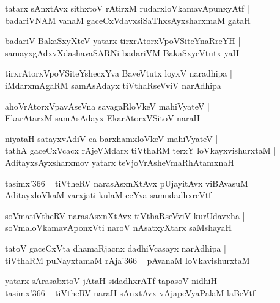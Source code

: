 \documentclass[twoside,12pt,openright]{book}
\newcounter{shloka}[chapter]
\begin{document}
\begin{shloka}
tatarx sAnxtAvx sithxtoV rAtirxM rudarxloVkamavApunxyAtf |\\
badariVNAM vanaM gaceCxVdavxsiSaThxsAyxsharxmaM gataH 
\end{shloka}

\begin{shloka}
badariV BakaSxyXteV yatarx tirxrAtorxVpoVSiteYnaRreYH |\\
samayxgAdxvXdashavaSARNi badariVM BakaSxyeVtutx yaH 
\end{shloka}

\begin{shloka}
tirxrAtorxVpoVSiteYshecxYva BaveVtutx loyxV naradhipa |\\
iMdarxmAgaRM samAsAdayx tiVthaRseVviV narAdhipa
\end{shloka}

\begin{shloka}
ahoVrAtorxVpavAseVna savagaRloVkeV mahiVyateV |\\
EkarAtarxM samAsAdayx EkarAtorxVSitoV naraH  
\end{shloka}

\begin{shloka}
niyataH satayxvAdiV ca barxhamxloVkeV mahiVyateV |\\
tathA gaceCxVcacx rAjeVMdarx tiVthaRM terxY loVkayxvishurxtaM |\\
AditayxsAyxsharxmov yatarx teVjoVrAsheVmaRhAtamxnaH  
\end{shloka}

\begin{shloka}
tasimx\char'366 ~ tiVtheRV narasAsxnXtAvx pUjayitAvx viBAvasuM |\\
AditayxloVkaM varxjati kulaM ceYva samudadhxreVtf 
\end{shloka}

\begin{shloka}
soVmatiVtheRV narasAsxnXtAvx tiVthaRseVviV kurUdavxha |\\
soVmaloVkamavAponxVti naroV nAsatxyXtarx saMshayaH 
\end{shloka}

\begin{shloka}
tatoV gaceCxVta dhamaRjacnx dadhiVcasayx narAdhipa |\\
tiVthaRM puNayxtamaM rAja\char'366 ~ pAvanaM loVkavishurxtaM 
\end{shloka}

\begin{shloka}
yatarx sArasabxtoV jAtaH sidadhxrATf tapasoV nidhiH |\\
tasimx\char'366 ~ tiVtheRV naraH sAnxtAvx vAjapeVyaPalaM laBeVtf 
\end{shloka}
\end{document}
